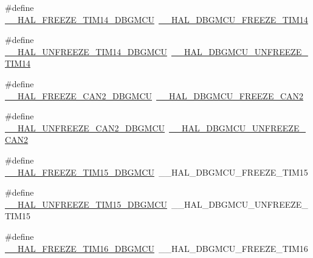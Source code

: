 \begin{DoxyCompactItemize}
\item 
\#define \hyperlink{group___h_a_l___d_b_g_m_c_u___aliased___macros_ga860c389b07136ce825179ce76a7a9a84}{\+\_\+\+\_\+\+H\+A\+L\+\_\+\+F\+R\+E\+E\+Z\+E\+\_\+\+T\+I\+M14\+\_\+\+D\+B\+G\+M\+CU}~\hyperlink{group___h_a_l___exported___macros_gaf4d10c15c1644eeff138829af21c219c}{\+\_\+\+\_\+\+H\+A\+L\+\_\+\+D\+B\+G\+M\+C\+U\+\_\+\+F\+R\+E\+E\+Z\+E\+\_\+\+T\+I\+M14}
\item 
\#define \hyperlink{group___h_a_l___d_b_g_m_c_u___aliased___macros_ga2f7f66b854108c4de12d6aa914df45aa}{\+\_\+\+\_\+\+H\+A\+L\+\_\+\+U\+N\+F\+R\+E\+E\+Z\+E\+\_\+\+T\+I\+M14\+\_\+\+D\+B\+G\+M\+CU}~\hyperlink{group___h_a_l___exported___macros_gaa62a0abc610b769d15fd9d20bdc14cd7}{\+\_\+\+\_\+\+H\+A\+L\+\_\+\+D\+B\+G\+M\+C\+U\+\_\+\+U\+N\+F\+R\+E\+E\+Z\+E\+\_\+\+T\+I\+M14}
\item 
\#define \hyperlink{group___h_a_l___d_b_g_m_c_u___aliased___macros_ga43d0b44177b120d9fc27e89f3e005b6d}{\+\_\+\+\_\+\+H\+A\+L\+\_\+\+F\+R\+E\+E\+Z\+E\+\_\+\+C\+A\+N2\+\_\+\+D\+B\+G\+M\+CU}~\hyperlink{group___h_a_l___exported___macros_gadb4f2b03a03936de95c1a9f939d452c0}{\+\_\+\+\_\+\+H\+A\+L\+\_\+\+D\+B\+G\+M\+C\+U\+\_\+\+F\+R\+E\+E\+Z\+E\+\_\+\+C\+A\+N2}
\item 
\#define \hyperlink{group___h_a_l___d_b_g_m_c_u___aliased___macros_gae3d5f3cd8eb21e021fc1fb24c8449b99}{\+\_\+\+\_\+\+H\+A\+L\+\_\+\+U\+N\+F\+R\+E\+E\+Z\+E\+\_\+\+C\+A\+N2\+\_\+\+D\+B\+G\+M\+CU}~\hyperlink{group___h_a_l___exported___macros_ga10fd523f4709571f091465b8d58ad385}{\+\_\+\+\_\+\+H\+A\+L\+\_\+\+D\+B\+G\+M\+C\+U\+\_\+\+U\+N\+F\+R\+E\+E\+Z\+E\+\_\+\+C\+A\+N2}
\item 
\#define \hyperlink{group___h_a_l___d_b_g_m_c_u___aliased___macros_ga4335fd0cf07d5e111fdbbedd9bc4c770}{\+\_\+\+\_\+\+H\+A\+L\+\_\+\+F\+R\+E\+E\+Z\+E\+\_\+\+T\+I\+M15\+\_\+\+D\+B\+G\+M\+CU}~\+\_\+\+\_\+\+H\+A\+L\+\_\+\+D\+B\+G\+M\+C\+U\+\_\+\+F\+R\+E\+E\+Z\+E\+\_\+\+T\+I\+M15
\item 
\#define \hyperlink{group___h_a_l___d_b_g_m_c_u___aliased___macros_ga5c58c742b90ca9312c3fce0e40b9bf17}{\+\_\+\+\_\+\+H\+A\+L\+\_\+\+U\+N\+F\+R\+E\+E\+Z\+E\+\_\+\+T\+I\+M15\+\_\+\+D\+B\+G\+M\+CU}~\+\_\+\+\_\+\+H\+A\+L\+\_\+\+D\+B\+G\+M\+C\+U\+\_\+\+U\+N\+F\+R\+E\+E\+Z\+E\+\_\+\+T\+I\+M15
\item 
\#define \hyperlink{group___h_a_l___d_b_g_m_c_u___aliased___macros_ga90a56093c5a77913d29f5fcc62b72ad9}{\+\_\+\+\_\+\+H\+A\+L\+\_\+\+F\+R\+E\+E\+Z\+E\+\_\+\+T\+I\+M16\+\_\+\+D\+B\+G\+M\+CU}~\+\_\+\+\_\+\+H\+A\+L\+\_\+\+D\+B\+G\+M\+C\+U\+\_\+\+F\+R\+E\+E\+Z\+E\+\_\+\+T\+I\+M16

\end{DoxyCompactItemize}
